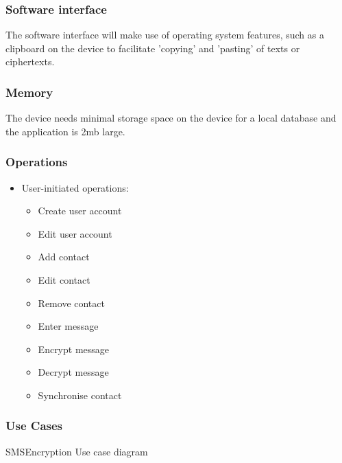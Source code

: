 \subsubsection{Software interface}
 The software interface will make use of operating system features, such as a clipboard on the device to facilitate 'copying' and 'pasting' of texts or ciphertexts.
\subsubsection{Memory}
The device needs minimal storage space on the device for a local database and the application is 2mb large.
\subsubsection{Operations}
\begin{itemize}
\item User-initiated operations:
\begin{itemize}
\item Create user account
\item Edit user account
\item Add contact
\item Edit contact
\item Remove contact
\item Enter message
\item Encrypt message
\item Decrypt message
\item Synchronise contact
\end{itemize}
\end{itemize}


\subsubsection{Use Cases}
SMSEncryption Use case diagram


